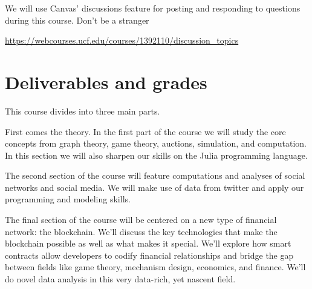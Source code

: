\documentclass[11pt]{article}
\begin{document}
We will use Canvas' discussions feature for posting and responding to questions
during this course. Don't be a stranger
%
\vspace{-0.1in}
\begin{center}
\url{https://webcourses.ucf.edu/courses/1392110/discussion_topics}
\end{center}
\vspace{-0.1in}
%
\section*{Deliverables and grades}

This course divides into three main parts.

First comes the theory. In the first part of the course we will study the core
concepts from graph theory, game theory, auctions, simulation, and computation.
In this section we will also sharpen our skills on the Julia programming
language.

The second section of the course will feature computations and analyses of
social networks and social media. We will make use of data from twitter and
apply our programming and modeling skills.

The final section of the course will be centered on a new type of financial
network: the blockchain. We'll discuss the key technologies that make the
blockchain possible as well as what makes it special. We'll explore how smart
contracts allow developers to codify financial relationships and bridge the gap
between fields like game theory, mechanism design, economics, and finance. We'll
do novel data analysis in this very data-rich, yet nascent field.
\end{document}
